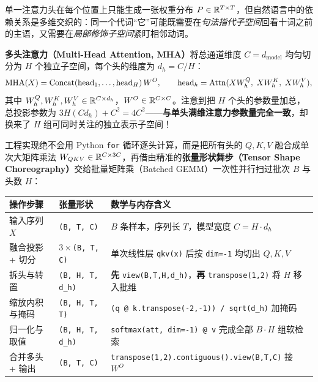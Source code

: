 单一注意力头在每个位置上只能生成一张权重分布 $P \in \mathbb{R}^{T \times T}$，但自然语言中的依赖关系是多维交织的：同一个代词“它”可能既需要在\emph{句法指代子空间}回看十词之前的主语，又需要在\emph{局部修饰子空间}紧盯相邻动词。

\textbf{多头注意力（Multi-Head Attention, MHA）}将总通道维度 $C = d_{\text{model}}$ 均匀切分为 $H$ 个独立子空间，每个头的维度为 $d_h = C / H$：
\begin{equation}
  \operatorname{MHA}(X) = \operatorname{Concat}\!\left(\operatorname{head}_1, \dots, \operatorname{head}_H\right) W^O,
  \qquad
  \operatorname{head}_h = \operatorname{Attn}(X W_h^Q,\; X W_h^K,\; X W_h^V),
  \label{eq:mha}
\end{equation}
其中 $W_h^Q, W_h^K, W_h^V \in \mathbb{R}^{C \times d_h}$，$W^O \in \mathbb{R}^{C \times C}$。注意到把 $H$ 个头的参数量加总，总投影参数为 $3 H (C d_h) + C^2 = 4 C^2$——\textbf{与单头满维注意力参数量完全一致}，却换来了 $H$ 组可同时关注的独立表示子空间！

工程实现绝不会用 Python \texttt{for} 循环逐头计算，而是把所有头的 $Q, K, V$ 融合成单次大矩阵乘法 $W_{QKV} \in \mathbb{R}^{C \times 3C}$，再借由精准的\textbf{张量形状舞步（Tensor Shape Choreography）}交给批量矩阵乘（Batched GEMM）一次性并行扫过批次 $B$ 与头数 $H$：

\begin{center}
\footnotesize
\begin{tabularx}{\linewidth}{@{}p{26mm}p{34mm}X@{}}
\toprule
\textbf{操作步骤} & \textbf{张量形状} & \textbf{数学与内存含义} \\
\midrule
输入序列 $X$ & \texttt{(B, T, C)} & $B$ 条样本，序列长 $T$，模型宽度 $C = H \cdot d_h$ \\
融合投影 + 切分 & $3\times$\texttt{(B, T, C)} & 单次线性层 \texttt{qkv(x)} 后按 \texttt{dim=-1} 均切出 $Q, K, V$ \\
拆头与转置 & \texttt{(B, H, T, d\_h)} & \textbf{先} \texttt{view(B,T,H,d\_h)}，\textbf{再} \texttt{transpose(1,2)} 将 $H$ 移入批维 \\
缩放内积与掩码 & \texttt{(B, H, T, T)} & \texttt{(q @ k.transpose(-2,-1)) / sqrt(d\_h)} 加掩码 \\
归一化与取值 & \texttt{(B, H, T, d\_h)} & \texttt{softmax(att, dim=-1) @ v} 完成全部 $B\cdot H$ 组软检索 \\
合并多头 + 输出 & \texttt{(B, T, C)} & \texttt{transpose(1,2).contiguous().view(B,T,C)} 接 $W^O$ \\
\bottomrule
\end{tabularx}
\end{center}

